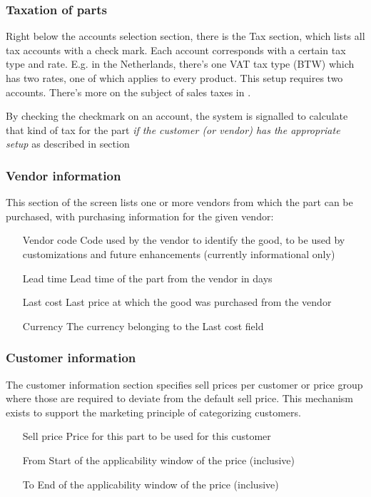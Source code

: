 \subsubsection{Taxation of parts}
\label{subsec:PartTaxation}

Right below the accounts selection section, there is the Tax section, which lists
all tax accounts with a check mark. Each account corresponds with a certain tax type
and rate. E.g. in the Netherlands, there's one VAT tax type (BTW) which has two rates,
one of which applies to every product. This setup requires two accounts. There's more
on the subject of sales taxes in .

By checking the checkmark on an account, the system is signalled to calculate that
kind of tax for the part {\it if the customer (or vendor) has the appropriate setup}
as described in section


\subsubsection{Vendor information}

This section of the screen lists one or more vendors from which the part can be
purchased, with purchasing information for the given vendor:

\begin{itemize}
\item [Vendor code] Code used by the vendor to identify the good, to be used by
    customizations and future enhancements (currently informational only)
\item [Lead time] Lead time of the part from the vendor in days
\item [Last cost] Last price at which the good was purchased from the vendor
\item [Currency] The currency belonging to the Last cost field
\end{itemize}

\subsubsection{Customer information}

The customer information section specifies sell prices per customer or price group
where those are required to deviate from the default sell price. This mechanism exists
to support the marketing principle of categorizing customers.

\begin{itemize}
\item [Sell price] Price for this part to be used for this customer
\item [From] Start of the applicability window of the price (inclusive)
\item [To] End of the applicability window of the price (inclusive)
\end{itemize}

